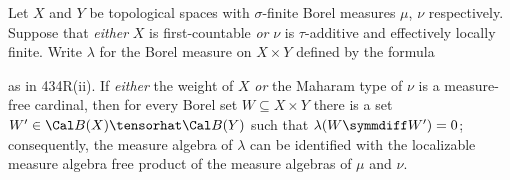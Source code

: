 
 Let $X$ and $Y$ be topological spaces with
$\sigma$-finite Borel measures $\mu$, $\nu$ respectively.   Suppose that
{\it either} $X$ is first-countable {\it or} $\nu$ is $\tau$-additive
and effectively locally finite.   Write $\lambda$ for the Borel measure
on $X\times Y$ defined by the formula


\noindent as in 434R(ii).   If {\it either} the weight of $X$ {\it or}
the Maharam type of $\nu$ is a measure-free cardinal, then for every
Borel set $W\subseteq X\times Y$ there is a set
$W'\in\Cal B(X)\tensorhat\Cal B(Y)$ such that
$\lambda(W\symmdiff W')=0$;  consequently, the measure algebra of
$\lambda$ can be identified with
the localizable measure algebra free product of the measure algebras of
$\mu$ and $\nu$.

